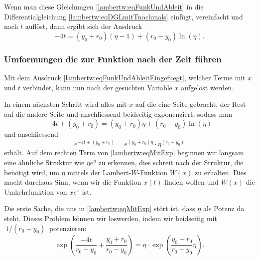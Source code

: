 Wenn man diese Gleichungen \eqref{lambertw:eqFunkUndAbleit} in die Differentialgleichung \eqref{lambertw:eqDGLmitTnochmals} einfügt, vereinfacht und nach \(t\) auflöst, dann ergibt sich der Ausdruck
\begin{equation}
	-4t
	=
	\left(y_0+r_0\right)\left(\eta-1\right)+\left(r_0-y_0\right)\operatorname{ln}\left(\eta\right).
	\label{lambertw:eqFunkUndAbleitEingefuegt}
\end{equation}

\subsubsection{Umformungen die zur Funktion nach der Zeit führen
	\label{lambertw:subsubsection:UmformBisZumZiel}}
Mit dem Ausdruck \eqref{lambertw:eqFunkUndAbleitEingefuegt}, welcher Terme mit \(x\) und \(t\) verbindet, kann nun nach der gesuchten Variable \(x\) aufgelöst werden. 

In einem nächsten Schritt wird alles mit \(x\) auf die eine Seite gebracht, der Rest auf die andere Seite und anschliessend beidseitig exponenziert, sodass man 
\begin{equation}
	-4t+\left(y_0+r_0\right)
	=
	\left(y_0+r_0\right)\eta+\left(r_0-y_0\right)\operatorname{ln}\left(\eta\right)
\end{equation}
und anschliessend
\begin{equation}
	e^{\displaystyle -4t+\left(y_0+r_0\right)}
	=
	e^{\displaystyle \left(y_0+r_0\right)\eta}\cdot\eta^{\displaystyle \left(r_0-y_0\right)}
	\label{lambertw:eqMitExp}
\end{equation}
erhält.
Auf dem rechten Term von \eqref{lambertw:eqMitExp} beginnen wir langsam eine ähnliche Struktur wie \(\eta e^\eta\) zu erkennen, dies schreit nach der Struktur, die benötigt wird, um \(\eta\) mittels der Lambert-\(W\)-Funktion \(W(x)\) zu erhalten. Dies macht durchaus Sinn, wenn wir die Funktion \(x(t)\) finden wollen und \(W(x)\) die Umkehrfunktion von \(x e^x\) ist. 

Die erste Sache, die uns in \eqref{lambertw:eqMitExp} stört ist, dass \(\eta\) als Potenz da steht. Dieses Problem können wir loswerden, indem wir beidseitig mit \(\:1 / (r_0-y_0)\:\) potenzieren:
\begin{equation}
	\operatorname{exp}\left(\displaystyle \frac{-4t}{r_0-y_0}+\frac{y_0+r_0}{r_0-y_0}\right)
	=
	\eta\cdot \operatorname{exp}\left(\displaystyle \frac{y_0+r_0}{r_0-y_0}\eta\right).
	\label{lambertw:eqOhnePotenz}
\end{equation}

